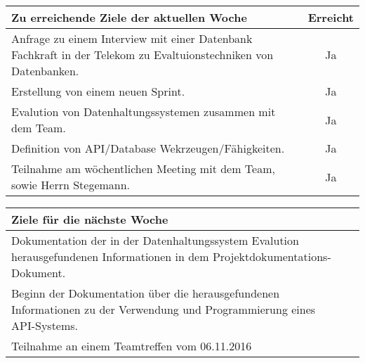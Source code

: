 \begin{tabularx}{\textwidth}{Xc}
    \arrayrulecolor{OliveGreen}
    \toprule
    {\bfseries Zu erreichende Ziele der aktuellen Woche} & {\bfseries Erreicht} \\
    \midrule[2pt]
    Anfrage zu einem Interview mit einer Datenbank Fachkraft in der
    Telekom zu Evaltuionstechniken von Datenbanken.  & Ja  \\
    \rowcolor{OliveGreen!15}
    Erstellung von einem neuen Sprint.  & Ja  \\
    \rowcolor{White}
    Evalution von Datenhaltungssystemen zusammen mit dem Team.  & Ja  \\
    \rowcolor{OliveGreen!15}
    Definition von API/Database Wekrzeugen/Fähigkeiten.  & Ja  \\
    \rowcolor{White}
    Teilnahme am wöchentlichen Meeting mit dem Team, sowie Herrn
    Stegemann.  & Ja \\
    \bottomrule[2pt]
\end{tabularx}
%
\vspace{1cm}
%
\begin{tabularx}{\textwidth}{Xc}
    \arrayrulecolor{OliveGreen}
    \toprule
    {\bfseries Ziele für die nächste Woche}              &                   \\
    \midrule[2pt]
    Dokumentation der in der Datenhaltungssystem Evalution
    herausgefundenen Informationen in dem 
    Projektdokumentations-Dokument.  & \\
    \rowcolor{OliveGreen!15}
    Beginn der Dokumentation über die herausgefundenen Informationen
    zu der Verwendung und Programmierung eines API-Systems.  &  \\
    \rowcolor{White}
    Teilnahme an einem Teamtreffen vom 06.11.2016  &  \\
\end{tabularx}
